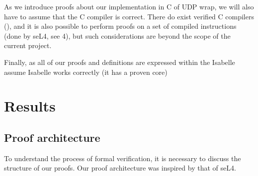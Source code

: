 \documentclass[twoside]{memoir}
\begin{document}
As we introduce proofs about our implementation in C of UDP wrap,
we will also have to assume that the C compiler is correct.
There do exist verified C compilers (\cite{compcert}),
and it is also possible to perform proofs on a set of compiled instructions
(done by seL4, see \cite{Klein2014Verification}{4}),
but such considerations are beyond the scope of the current project.

Finally, as all of our proofs and definitions are expressed within the Isabelle 
assume Isabelle works correctly (it has a proven core)

\chapter{Results}
\section{Proof architecture}
To understand the process of formal verification,
it is necessary to discuss the structure of our proofs.
Our proof architecture was inspired by that of seL4.
\end{document}
